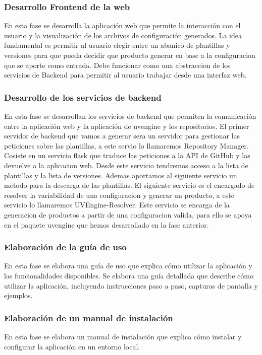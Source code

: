 \documentclass[12pt, a4paper, twoside]{article}
\begin{document}
\subsubsection{Desarrollo Frontend de la web}
En esta fase se desarrolla la aplicación web que permite la interacción con el usuario y la visualización de los archivos de configuración generados.
La idea fundamental es permitir al usuario elegir entre un abanico de plantillas y versiones para que pueda decidir que producto generar en base a la configuracion que se aporte como entrada.
Debe funcionar como una abstraccion de los servicios de Backend para permitir al usuario trabajar desde una interfaz web.
\subsubsection{Desarrollo de los servicios de backend}
\label{sec:Desarrollo de los servicios de backend}
En esta fase se desarrollan los servicios de backend que permiten la comunicación entre la aplicación web y la aplicación de uvengine y los repositorios.
El primer servidor de backend que vamos a generar sera un servidor para gestionar las peticiones sobre las plantillas, a este servio lo llamaremos Repository Manager. 
Cosiste en un servicio flask que traduce las peticiones a la API de GitHub y las devuelve a la aplicacion web. Desde este servicio tendremos acceso a la lista de plantillas y la lista de versiones.
Ademas aportamos al siguiente servicio un metodo para la descarga de las plantillas. El siguiente servicio es el encargado de resolver la variabilidad de una configuracion y generar un producto, a este servicio lo llamaremos UVEngine-Resolver.
Este servicio se encarga de la generacion de productos a partir de una configuracion valida, para ello se apoya en el paquete uvengine que hemos desarrollado en la fase anterior.

\subsubsection{Elaboración de la guía de uso}
En esta fase se elabora una guía de uso que explica cómo utilizar la aplicación y las funcionalidades disponibles.
Se elabora una guía detallada que describe cómo utilizar la aplicación, incluyendo instrucciones paso a paso, capturas 
de pantalla y ejemplos. 
\subsubsection{Elaboración de un manual de instalación}
En esta fase se elabora un manual de instalación que explica cómo instalar y configurar la aplicación en un entorno local.
\end{document}
